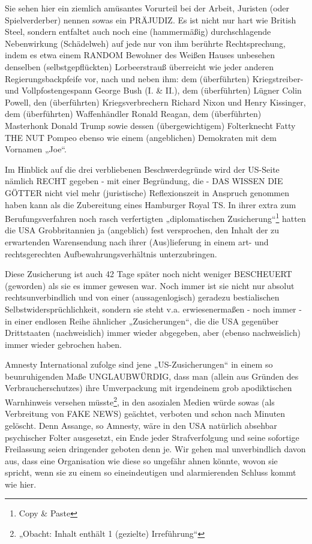 \begin{multicols}{2}
Sie sehen hier ein ziemlich amüsantes Vorurteil bei der
Arbeit, Juristen (oder Spielverderber) nennen sowas ein
PRÄJUDIZ. Es ist nicht nur hart wie British Steel, sondern
entfaltet auch noch eine (hammermäßig) durchschlagende Nebenwirkung (Schädelweh) auf jede nur von ihm
berührte Rechtsprechung, indem es etwa einem RANDOM Bewohner des Weißen Hauses unbesehen denselben (selbstgepflückten) Lorbeerstrauß überreicht wie jeder anderen Regierungsbackpfeife vor, nach und neben
ihm: dem (überführten) Kriegstreiber- und Vollpfostengespann George Bush (I. \& II.), dem (überführten) Lügner Colin Powell, den (überführten) Kriegsverbrechern
Richard Nixon und Henry Kissinger, dem (überführten)
Waffenhändler Ronald Reagan, dem (überführten) Masterhonk Donald Trump sowie dessen (übergewichtigem)
Folterknecht Fatty THE NUT Pompeo ebenso wie einem
(angeblichen) Demokraten mit dem Vornamen „Joe“.

Im Hinblick auf die drei verbliebenen Beschwerdegründe wird der US-Seite nämlich RECHT gegeben - mit
einer Begründung, die - DAS WISSEN DIE GÖTTER nicht viel mehr (juristische) Reflexionszeit in Anspruch
genommen haben kann als die Zubereitung eines Hamburger Royal TS. In ihrer extra zum Berufungsverfahren noch rasch verfertigten 
„diplomatischen Zusicherung“\footnote[30]{Copy \& Paste}
hatten die USA Grobbritannien ja (angeblich) fest versprochen, den Inhalt der zu erwartenden Warensendung
nach ihrer (Aus)lieferung in einem art- und rechtsgerechten Aufbewahrungsverhältnis unterzubringen.

Diese Zusicherung ist auch 42 Tage später noch nicht
weniger BESCHEUERT (geworden) als sie es immer gewesen war. Noch immer ist sie nicht nur absolut rechtsunverbindlich und von einer (aussagenlogisch) geradezu bestialischen Selbstwidersprüchlichkeit, sondern
sie steht v.a. erwiesenermaßen - noch immer - in einer
endlosen Reihe ähnlicher „Zusicherungen“, die die USA
gegenüber Drittstaaten (nachweislich) immer wieder
abgegeben, aber (ebenso nachweislich) immer wieder
gebrochen haben.

Amnesty International zufolge sind jene „US-Zusicherungen“ in einem so beunruhigenden Maße UNGLAUBWÜRDIG, dass man (allein aus Gründen des Verbraucherschutzes) ihre Umverpackung mit irgendeinem
grob apodiktischen Warnhinweis versehen müsste\footnote[31]{„Obacht: Inhalt enthält 1 (gezielte) Irreführung“}, in
den asozialen Medien würde sowas (als Verbreitung von
FAKE NEWS) geächtet, verboten und schon nach Minuten gelöscht. Denn Assange, so Amnesty, wäre in den
USA natürlich absehbar psychischer Folter ausgesetzt,
ein Ende jeder Strafverfolgung und seine sofortige Freilassung seien dringender geboten denn je. Wir gehen
mal unverbindlich davon aus, dass eine Organisation
wie diese so ungefähr ahnen könnte, wovon sie spricht,
wenn sie zu einem so eineindeutigen und alarmierenden Schluss kommt wie hier.


\end{multicols}
